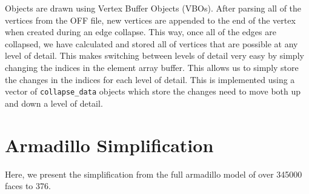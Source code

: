 \documentclass[11pt]{article}
\begin{document}
Objects are drawn using Vertex Buffer Objects (VBOs). After parsing all of the
vertices from the OFF file, new vertices are appended to the end of the vertex
when created during an edge collapse. This way, once all of the edges are
collapsed, we have calculated and stored all of vertices that are possible at
any level of detail. This makes switching between levels of detail very easy by
simply changing the indices in the element array buffer. This allows us to
simply store the changes in the indices for each level of detail. This is
implemented using a vector of \verb`collapse_data` objects which store the changes
need to move both up and down a level of detail.

\section{Armadillo Simplification}

Here, we present the simplification from the full armadillo model of over
345000 faces to 376.
\end{document}
